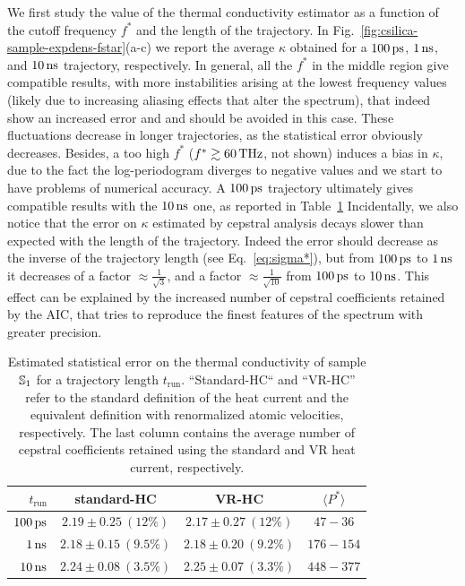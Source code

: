 We first study the value of the thermal conductivity estimator as a function of the cutoff frequency $f^*$ and the length of the trajectory. 
In Fig.~\ref{fig:csilica-sample-expdens-fstar}(a-c) we report the average $\kappa$ obtained for a $100\,\mathrm{ps}$, $1\,\mathrm{ns}$, and $10\,\mathrm{ns}$ trajectory, respectively. 
In general, all the $f^*$ in the middle region give compatible results, with more instabilities arising at the lowest frequency values (likely due to increasing aliasing effects that alter the spectrum), that indeed show an increased error and and should be avoided in this case. These fluctuations decrease in longer trajectories, as the statistical error obviously decreases. Besides, a too high $f^*$ ($f^*\gtrsim 60\,\mathrm{THz}$, not shown) induces a bias in $\kappa$, due to the fact the log-periodogram diverges to negative values and we start to have problems of numerical accuracy. 
A $100\,\mathrm{ps}$ trajectory ultimately gives compatible results with the $10\,\mathrm{ns}$ one, as reported in Table~\ref{tab:csilica-sample-kappa-cepstral}
Incidentally, we also notice that the error on $\kappa$ estimated by cepstral analysis decays slower than expected with the length of the trajectory. Indeed the error should decrease as the inverse of the trajectory length (see Eq.~\eqref{eq:sigma*}), but from $100\,\mathrm{ps}$ to $1\,\mathrm{ns}$ it decreases of a factor $\approx \frac{1}{\sqrt{3}}$, and a factor $\approx \frac{1}{\sqrt{10}}$ from $100\,\mathrm{ps}$ to $10\,\mathrm{ns}$. This effect can be explained by the increased number of cepstral coefficients retained by the AIC, that tries to reproduce the finest features of the spectrum with greater precision. 

\begin{table}[!tb]
    \centering
    \begin{tabular}{r|cc|c}
        $t_\mathrm{run}$ & \textbf{standard-HC} & \textbf{VR-HC} & \textbf{$\langle P^* \rangle$} \\
        \hline
        $100\,\mathrm{ps}$ & $2.19 \pm 0.25\: (12\%)$  & $2.17 \pm 0.27\: (12\%)$ & $47-36$\\
        $1\,\mathrm{ns}$   & $2.18 \pm 0.15\: (9.5\%)$ & $2.18 \pm 0.20\: (9.2\%)$ & $176-154$ \\
        $10\,\mathrm{ns}$  & $2.24 \pm 0.08\: (3.5\%)$ & $2.25 \pm 0.07\: (3.3\%)$ & $448-377$
    \end{tabular}
    \caption{Estimated statistical error on the thermal conductivity of sample $\S1$ for a trajectory length $t_\mathrm{run}$. ``Standard-HC`` and ``VR-HC'' refer to the standard definition of the heat current and the equivalent definition with renormalized atomic velocities, respectively. The last column contains the average number of cepstral coefficients retained using the standard and VR heat current, respectively. }
    \label{tab:csilica-sample-kappa-cepstral}
\end{table}

